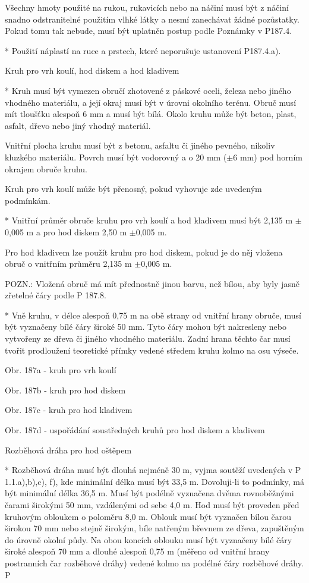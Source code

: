   Všechny hmoty použité na rukou, rukavicích nebo na náčiní musí být z náčiní snadno odstranitelné použitím vlhké látky a nesmí zanechávat žádné pozůstatky. Pokud tomu tak nebude, musí být uplatněn postup podle Poznámky v P187.4.

  * Použití náplastí na ruce a prstech, které neporušuje ustanovení P187.4.a).
  \enditems

Kruh pro vrh koulí, hod diskem a hod kladivem

* Kruh musí být vymezen obručí zhotovené z páskové oceli, železa nebo jiného vhodného materiálu, a její okraj musí být v úrovni okolního terénu. Obruč musí mít tloušťku alespoň 6 mm a musí být bílá. Okolo kruhu může být beton, plast, asfalt, dřevo nebo jiný vhodný materiál.

Vnitřní plocha kruhu musí být z betonu, asfaltu či jiného pevného, nikoliv kluzkého materiálu. Povrch musí být vodorovný a o 20 mm ($\pm$6 mm) pod horním okrajem obruče kruhu.

Kruh pro vrh koulí může být přenosný, pokud vyhovuje zde uvedeným podmínkám.

* Vnitřní průměr obruče kruhu pro vrh koulí a hod kladivem musí být 2,135 m $\pm$0,005 m a pro hod diskem 2,50 m $\pm$0,005 m.

Pro hod kladivem lze použít kruhu pro hod diskem, pokud je do něj vložena obruč o vnitřním průměru 2,135 m $\pm$0,005 m.

POZN.: Vložená obruč má mít přednostně jinou barvu, než bílou, aby byly jasně zřetelné čáry podle P 187.8.

* Vně kruhu, v délce alespoň 0,75 m na obě strany od vnitřní hrany obruče, musí být vyznačeny bílé čáry široké 50 mm. Tyto čáry mohou být nakresleny nebo vytvořeny ze dřeva či jiného vhodného materiálu. Zadní hrana těchto čar musí tvořit prodloužení teoretické přímky vedené středem kruhu kolmo na osu výseče.

Obr. 187a - kruh pro vrh koulí

Obr. 187b - kruh pro hod diskem

Obr. 187c - kruh pro hod kladivem

Obr. 187d - uspořádání soustředných kruhů pro hod diskem a kladivem

Rozběhová dráha pro hod oštěpem

* Rozběhová dráha musí být dlouhá nejméně 30 m, vyjma soutěží uvedených v P 1.1.a),b),c), f), kde minimální délka musí být 33,5 m. Dovoluji-li to podmínky, má být minimální délka 36,5 m. Musí být podélně vyznačena dvěma rovnoběžnými čarami širokými 50 mm, vzdálenými od sebe 4,0 m. Hod musí být proveden před kruhovým obloukem o poloměru 8,0 m. Oblouk musí být vyznačen bílou čarou širokou 70 mm nebo stejně širokým, bíle natřeným břevnem ze dřeva, zapuštěným do úrovně okolní půdy. Na obou koncích oblouku musí být vyznačeny bílé čáry široké alespoň 70 mm a dlouhé alespoň 0,75 m (měřeno od vnitřní hrany postranních čar rozběhové dráhy) vedené kolmo na podélné čáry rozběhové dráhy. P

